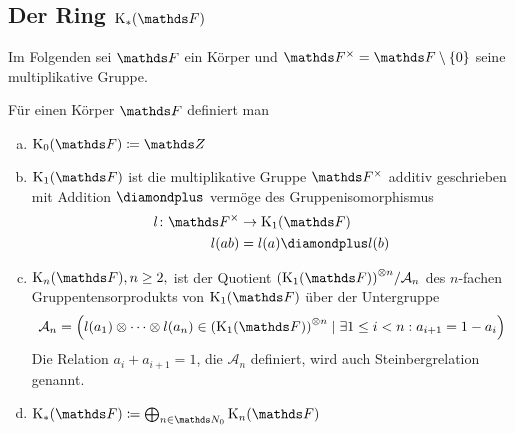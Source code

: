 \documentclass[ngerman,fontsize=11pt, paper=a4, parskip=half, titlepage=true, toc=bib]{scrartcl}
\begin{document}
\subsection{Der Ring $\KF$}
Im Folgenden sei $\F$ ein Körper und $\Fx=\F\setminus \{0\}$ seine
multiplikative Gruppe.

\begin{Def}[$\KF$]\label{defkf}
  Für einen Körper $\F$ definiert man
  \begin{enumerate}[a)]
  \item $\K_0(\F)\coloneqq \Z$
  \item $\K_1(\F)$ ist die multiplikative Gruppe $\Fx$ 
    additiv geschrieben mit Addition $\p$
    vermöge des Gruppenisomorphismus 
    \begin{align*}
      l\colon \Fx&\to \K_1(\F)\\
      l(ab)&=l(a)\p l(b)
    \end{align*}
  \item $\KnF, n\geq 2,$ ist der Quotient 
    ${(\K_1(\F))}^{\otimes n}/\calA_n$
    des $n$-fachen Gruppentensorprodukts von $\K_1(\F)$ über der
    Untergruppe 
    \begin{gather*}
      \calA_n=\left( 
        l(a_1)\otimes\dotsb\otimes l(a_n)
        \in {(\K_1(\F))}^{\otimes n}
        \mid  %
        \exists 1\leq i < n : a_{i+1}=1-a_i 
      \right)
    \end{gather*}
    Die Relation $a_i+a_{i+1}=1$, die $\mathcal{A}_n$ definiert,
    wird auch Steinbergrelation genannt.
  \item $\KF\coloneqq \bigoplus_{n\in\N_0}\KnF$
  \end{enumerate}
\end{Def}
\end{document}
